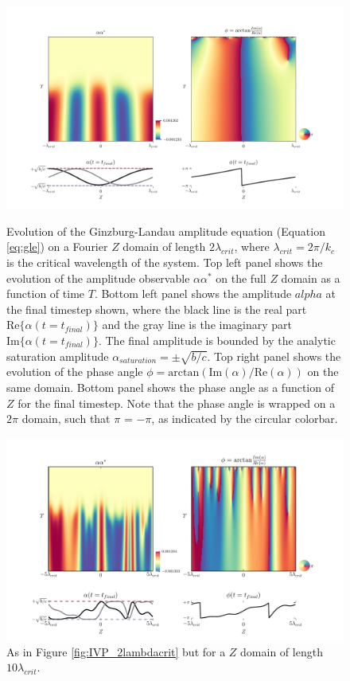 \documentclass[twocolumn]{aastex61}
\begin{document}
\begin{figure}[h!]
\centering
\includegraphics[width=\textwidth]{IVP_plot_thingap_AA_phase_2lambdacrit_2.pdf}
\caption{Evolution of the Ginzburg-Landau amplitude equation (Equation \ref{eq:gle}) on a Fourier $Z$ domain of length $2 \lambda_{crit}$, where $\lambda_{crit} = 2\pi/k_c$ is the critical wavelength of the system. Top left panel shows the evolution of the amplitude observable $\alpha \alpha^*$ on the full $Z$ domain as a function of time $T$. Bottom left panel shows the amplitude $alpha$ at the final timestep shown, where the black line is the real part $\mathrm{Re}\{\alpha(t = t_{final})\}$ and the gray line is the imaginary part $\mathrm{Im}\{\alpha(t = t_{final})\}$. The final amplitude is bounded by the analytic saturation amplitude $\alpha_{saturation} = \pm \sqrt{b/c}$. Top right panel shows the evolution of the phase angle $\phi = \mathrm{arctan} (\mathrm{Im}(\alpha)/\mathrm{Re}(\alpha))$ on the same domain. Bottom panel shows the phase angle as a function of $Z$ for the final timestep. Note that the phase angle is wrapped on a $2\pi$ domain, such that $\pi$ = $-\pi$, as indicated by the circular colorbar.}\label{fig:IVP_2lambdacrit}

\centering
\includegraphics[width=\textwidth]{IVP_plot_thingap_AA_phase_2lambdacrit_10.pdf}
\caption{As in Figure \ref{fig:IVP_2lambdacrit} but for a $Z$ domain of length $10 \lambda_{crit}$.}\label{fig:IVP_10lambdacrit}
\end{figure}
\end{document}
